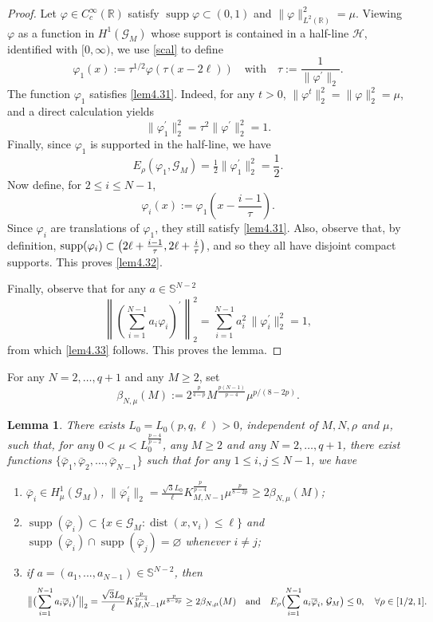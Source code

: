 \documentclass[11pt]{amsart}
\newtheorem{lemma}[theorem]{Lemma}
\newcommand{\G}{\mathcal{G}}
\newcommand{\vv}{\mathrm{v}}
\numberwithin{equation}{section}
\begin{document}
\begin{proof}
Let \(\varphi\in C_c^\infty(\mathbb{R})\) satisfy \(\operatorname{supp}\varphi\subset(0,1)\) and \(\|\varphi\|_{L^2(\mathbb{R})}^2=\mu\). 
	Viewing \(\varphi\) as a function in \(H^{1}(\mathcal{G}_M)\) whose support is contained in a half-line $\mathcal{H}$, identified with \([0,\infty)\), we use \eqref{scal} to define
	\[
	\varphi_{1}(x):=\tau^{1/2}\varphi\left(\tau (x-2\ell)\right)\quad\text{with}\quad\tau:=\frac{1}{\|\varphi^{\prime}\|_2}.
	\]
	The function \(\varphi_{1}\) satisfies \ref{lem4.31}. Indeed, for any \(t>0\), \(\|\varphi^{t}\|_2^{2}=\|\varphi\|_2^{2}=\mu\), and a direct calculation yields
	\[
	\|\varphi^{\prime}_{1}\|^{2}_2=\tau^{2}\|\varphi^{\prime}\|^{2}_2=1.
	\]
	Finally, since \(\varphi_{1}\) is supported in the half-line, we have
	\[
	E_{\rho}(\varphi_{1},\mathcal{G}_M)=\tfrac{1}{2}\|\varphi^{\prime}_{1}\|^{2}_2=\frac{1}{2}.
	\]
	Now define, for \( 2\leq i\leq N-1\),
	\[
	\varphi_{i}(x):=\varphi_{1}\left(x-\frac{i-1}{\tau}\right).
	\]
	Since \(\varphi_{i}\) are translations of \(\varphi_{1}\), they still satisfy \ref{lem4.31}. Also, observe that, by definition, \(\operatorname{supp}(\varphi_{i})\subset\big{(}2\ell+\frac{i-1}{\tau},2\ell+\frac{i}{\tau}\big{)}\), and so they all have disjoint compact supports. This proves \ref{lem4.32}.

 Finally, observe that for any \(a\in\mathbb{S}^{N-2}\)
	\[
	\left\|\left(\sum_{i=1}^{N-1}a_{i}\varphi_{i}\right)^{\prime}\right\|^{2}_2=\sum_{i=1}^{N-1}a_{i}^{2}\,\|\varphi^{\prime}_{i}\|^{2}_2=1,
	\]
	from which \ref{lem4.33} follows. This proves the lemma.
\end{proof}
For any $N=2,\ldots,q+1$ and any $M \geq 2$, set
$$
\beta_{N,\mu}(M):=2^\frac{p}{4-p}M^\frac{p(N-1)}{p-4}\mu^{p/(8-2p)}.
$$
\begin{lemma}\label{lem controlled upper endpoint}
There exists $L_0=L_0(p,q,\ell)>0$, independent of $M,N,\rho$ and $\mu$, such that, for any $0<\mu<L_0^\frac{p-4}{p-2}$, any $M\geq 2$ and any $N=2,\ldots,q+1$, 
 there exist functions \(\{\bar{\varphi}_{1},\bar{\varphi}_{2},\ldots,\bar{\varphi}_{N-1}\}\) such that for any \(1\leq i,j\leq N-1\), we have
\begin{enumerate}[label=(\roman*)]
		\item\(\bar{\varphi}_{i}\in H^1_\mu(\G_M)\), \( \|\overline{\varphi}^{\prime}_{i}\|_2 =\frac{\sqrt{3}L_{0}}{\ell}
K^{\frac{p}{p-4}}_{M,N-1}
\mu^\frac{p}{8-2p} \geq 2\beta_{N,\mu}(M) \);\label{lem7.51}
		\item $\operatorname{supp}(\bar{\varphi}_{i}) \subset \{x\in \G_M:\operatorname{dist}(x,\vv_i)\leq\ell\}$ and \(\operatorname{supp}(\bar{\varphi}_{i})\cap\operatorname{supp}(\bar{\varphi}_{j})=\varnothing\) whenever \(i\neq j\);\label{lem7.52}
		\item  if \(a=(a_1,...,a_{N-1})\in\mathbb{S}^{N-2}\),  then $$\bigl{\|}\bigl{(}\sum_{i=1}^{N-1}a_{i}\overline{\varphi}_{i}\bigr{)}^{\prime}\bigr{\|}_2=\frac{\sqrt{3}L_0}{\ell}
K^{\frac{p}{p-4}}_{M,N-1}
\mu^\frac{p}{8-2p} \geq 2\beta_{N,\mu}(M) \quad  \text{and}\quad E_{\rho}\bigl{(}\sum_{i=1}^{N-1}a_{i}\overline{\varphi}_{i},\,\mathcal{G}_{M}\bigr{)} \leq 0, \quad \forall \rho \in[1/2,1].$$\label{lem7.53}
\end{enumerate}
\end{lemma}
\end{document}
